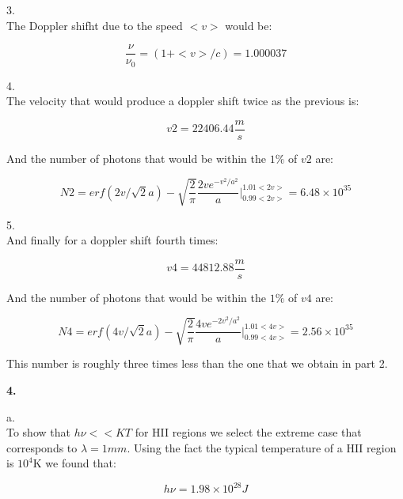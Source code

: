 \documentclass[12pt]{article}
\begin{document}
3. \\

The Doppler shifht due to the speed $<v>$ would be:

\begin{equation}
\dfrac{\nu}{\nu_0} = (1 + <v>/c) =  1.000037
\end{equation}

4. \\ 

The velocity that would produce a doppler shift twice as the previous
is:

\begin{equation}
v2 = 22406.44 \dfrac{m}{s}
\end{equation} 

And the number of photons that would be within the $1\%$ 
of $v2$ are:

\begin{equation}
N2 = erf(2v/\sqrt{2}a) - \sqrt{\dfrac{2}{\pi}} \dfrac{2v e^{-v^2/a^2}}{a} \Bigg|_{0.99<2v>}^{1.01<2v>}  = 6.48\times 10^{35} 
\end{equation}

5.\\

And finally for a doppler shift fourth times:

\begin{equation}
v4 = 44812.88 \dfrac{m}{s}
\end{equation}

And the number of photons that would be within the $1\%$
of $v4$ are:

\begin{equation}
N4 = erf(4v/\sqrt{2}a) - \sqrt{\dfrac{2}{\pi}} \dfrac{4v e^{-2v^2/a^2}}{a} \Bigg|_{0.99<4v>}^{1.01<4v>}  = 2.56\times 10^{35} 
\end{equation}

This number is roughly three times less than the one that we obtain in part 2. 


\begin{LARGE}
\textbf{4.}
\end{LARGE}

a.\\

To show that $h \nu << KT$ for HII regions we select the extreme case that
corresponds to $\lambda = 1mm$. Using the fact the typical temperature 
of a HII region is $10^4$K we found that: 

\begin{equation}
h \nu = 1.98 \times 10 ^{28} J
\end{equation} 
\end{document}

